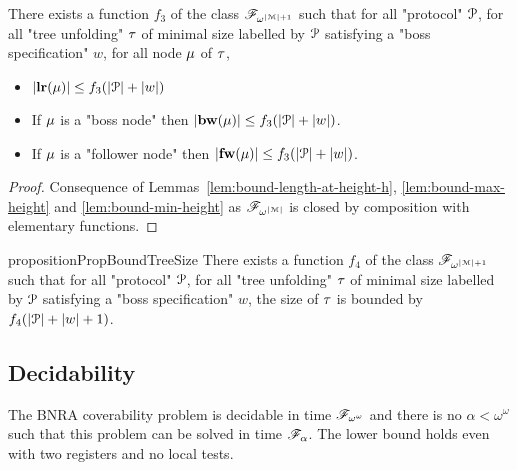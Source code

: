 \begin{corollary}
	\label{cor:bound-node-size}
	There exists a function $f_3$ of the class $\mathscr{F}_{\omega^{|\mathcal{M}|+1}}$ such that for all "protocol" $\mathcal{P}$, for all "tree unfolding" $\tau$ of minimal size labelled by $\mathcal{P}$ satisfying a "boss specification" $w$, for all node $\mu$ of $\tau$,
	
		\begin{itemize}
		\item $|\mathbf{lr}(\mu)| \leq f_3(|\mathcal{P}|+ |w|)$
			
		\item If $\mu$ is a "boss node" then $|\mathbf{bw}(\mu)| \leq f_3(|\mathcal{P}|+ |w|)$.
		
		\item If $\mu$ is a "follower node" then $|\mathbf{fw}(\mu)| \leq f_3(|\mathcal{P}|+ |w|)$.
	\end{itemize} 
\end{corollary}

\ifproofs
\begin{proof}
	Consequence of Lemmas~\ref{lem:bound-length-at-height-h}, \ref{lem:bound-max-height} and \ref{lem:bound-min-height} as $\mathscr{F}_{\omega^{|\mathcal{M}|}}$ is closed by composition with elementary functions.
\end{proof}
\fi
\begin{restatable}{proposition}{PropBoundTreeSize}
	\label{prop:bound-tree-size}
	There exists a function $f_4$ of the class $\mathscr{F}_{\omega^{|\mathcal{M}|+1}}$ such that for all "protocol" $\mathcal{P}$, for all "tree unfolding" $\tau$ of minimal size labelled by $\mathcal{P}$ satisfying a "boss specification" $w$, the size of $\tau$ is bounded by $f_4(|\mathcal{P}| + |w|+1)$.
\end{restatable}




\subsection{Decidability}
\label{sec:decidability-end}

\begin{theorem}
	The BNRA coverability problem is decidable in time $\mathscr{F}_{\omega^\omega}$ and there is no $\alpha < \omega^\omega$ such that this problem can be solved in time $\mathscr{F}_{\alpha}$.
	The lower bound holds even with two registers and no local tests.
\end{theorem}

